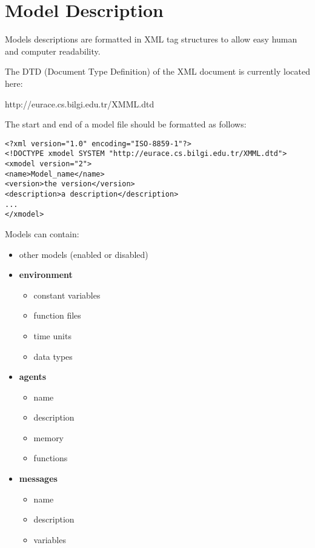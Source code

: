 \section{Model Description}
\label{model_description}

Models descriptions are formatted in XML tag structures to allow
easy human and computer readability.

The DTD (Document Type Definition) of the XML document is currently located
here:

http://eurace.cs.bilgi.edu.tr/XMML.dtd

The start and end of a model file should be formatted as follows:

\begin{mylisting}
\begin{verbatim}
<?xml version="1.0" encoding="ISO-8859-1"?>
<!DOCTYPE xmodel SYSTEM "http://eurace.cs.bilgi.edu.tr/XMML.dtd">
<xmodel version="2">
<name>Model_name</name>
<version>the version</version>
<description>a description</description>
...
</xmodel>
\end{verbatim}
\end{mylisting}

Models can contain:
\begin{itemize}
\item other models (enabled or disabled)
\item \textbf{environment}
\begin{itemize}
\item constant variables
\item function files
\item time units
\item data types
\end{itemize}
\item \textbf{agents}
\begin{itemize}
\item name
\item description
\item memory
\item functions
\end{itemize}
\item \textbf{messages}
\begin{itemize}
\item name
\item description
\item variables
\end{itemize}
\end{itemize}


